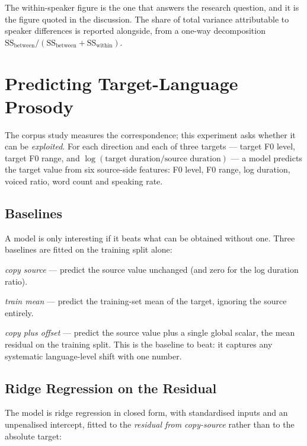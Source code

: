 The within-speaker figure is the one that answers the research question, and it is the figure
quoted in the discussion. The share of total variance attributable to speaker differences is
reported alongside, from a one-way decomposition
$\mathrm{SS}_{\text{between}}/(\mathrm{SS}_{\text{between}}+\mathrm{SS}_{\text{within}})$.

\section{Predicting Target-Language Prosody}
\label{sec:ridge}

The corpus study measures the correspondence; this experiment asks whether it can be
\emph{exploited}. For each direction and each of three targets --- target F0 level, target F0
range, and $\log(\text{target duration}/\text{source duration})$ --- a model predicts the target
value from six source-side features: F0 level, F0 range, log duration, voiced ratio, word count and
speaking rate.

\subsection{Baselines}
A model is only interesting if it beats what can be obtained without one. Three baselines are
fitted on the training split alone:

\begin{description}[leftmargin=2.6cm, style=nextline]
  \item[\textbf{B0}] \emph{copy source} --- predict the source value unchanged (and zero for the
        log duration ratio).
  \item[\textbf{B1}] \emph{train mean} --- predict the training-set mean of the target, ignoring
        the source entirely.
  \item[\textbf{B2}] \emph{copy plus offset} --- predict the source value plus a single global
        scalar, the mean residual on the training split. This is the baseline to beat: it captures
        any systematic language-level shift with one number.
\end{description}

\subsection{Ridge Regression on the Residual}
The model is ridge regression \cite{hoerl1970ridge} in closed form, with standardised inputs and
an unpenalised intercept, fitted to the \emph{residual from copy-source} rather than to the
absolute target:

